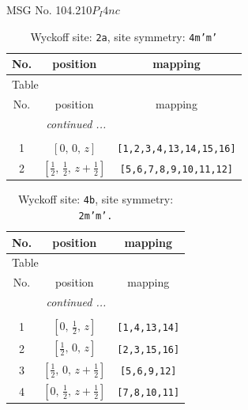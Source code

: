 \documentclass[fleqn,8pt]{jsarticle}
\begin{document}
\setcounter{MaxMatrixCols}{32}

\renewcommand{\tablename}{Table~}
\renewcommand{\figurename}{Figure~}
\begin{center}
\LARGE
MSG No. 104.210\quad$P_{I}4nc$
\end{center}
\renewcommand{\arraystretch}{1.2}
\begin{longtable}{ccc}
\caption{Wyckoff site: {\tt 2a}, site symmetry: {\tt 4m'm'}}
 \\
 \hline \hline
No. & position & mapping \\ \hline \endfirsthead

\multicolumn{2}{l}{\tablename\ \thetable{}} \\
 \hline \hline
No. & position & mapping \\ \hline \endhead

 \hline \hline
\multicolumn{2}{r}{\footnotesize\it continued ...} \\ \endfoot

 \hline \hline
\multicolumn{2}{r}{} \\ \endlastfoot

1 & $\left[ 0,\, 0,\, z \right]$ & {\tt [1,2,3,4,13,14,15,16]} \\ \hline
2 & $\left[ \frac{1}{2},\, \frac{1}{2},\, z + \frac{1}{2} \right]$ & {\tt [5,6,7,8,9,10,11,12]} \\
\end{longtable}
\renewcommand{\arraystretch}{1.2}
\begin{longtable}{ccc}
\caption{Wyckoff site: {\tt 4b}, site symmetry: {\tt 2m'm'.}}
 \\
 \hline \hline
No. & position & mapping \\ \hline \endfirsthead

\multicolumn{2}{l}{\tablename\ \thetable{}} \\
 \hline \hline
No. & position & mapping \\ \hline \endhead

 \hline \hline
\multicolumn{2}{r}{\footnotesize\it continued ...} \\ \endfoot

 \hline \hline
\multicolumn{2}{r}{} \\ \endlastfoot

1 & $\left[ 0,\, \frac{1}{2},\, z \right]$ & {\tt [1,4,13,14]} \\ \hline
2 & $\left[ \frac{1}{2},\, 0,\, z \right]$ & {\tt [2,3,15,16]} \\ \hline
3 & $\left[ \frac{1}{2},\, 0,\, z + \frac{1}{2} \right]$ & {\tt [5,6,9,12]} \\ \hline
4 & $\left[ 0,\, \frac{1}{2},\, z + \frac{1}{2} \right]$ & {\tt [7,8,10,11]} \\
\end{longtable}
\end{document}
